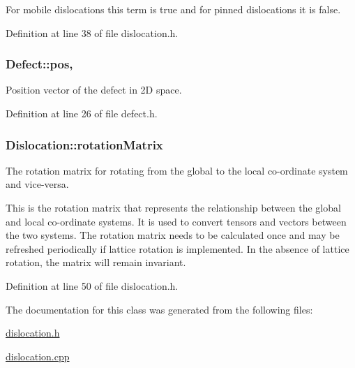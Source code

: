 For mobile dislocations this term is true and for pinned dislocations it is false. 

Definition at line 38 of file dislocation.\-h.

\hypertarget{classDefect_aed2731c1beefc22e3db6ad5b18194cdd}{
\subsubsection[{pos}]{ Defect\-::pos\hspace{0.3cm}{\ttfamily [protected]}, {\ttfamily [inherited]}}}\label{d5/d4f/classDefect_aed2731c1beefc22e3db6ad5b18194cdd}


Position vector of the defect in 2\-D space. 



Definition at line 26 of file defect.\-h.

\hypertarget{classDislocation_a5699d2984949af836396c8b7e5f21a5e}{
\subsubsection[{rotation\-Matrix}]{ Dislocation\-::rotation\-Matrix\hspace{0.3cm}{\ttfamily [protected]}}}\label{d3/dc6/classDislocation_a5699d2984949af836396c8b7e5f21a5e}


The rotation matrix for rotating from the global to the local co-\/ordinate system and vice-\/versa. 

This is the rotation matrix that represents the relationship between the global and local co-\/ordinate systems. It is used to convert tensors and vectors between the two systems. The rotation matrix needs to be calculated once and may be refreshed periodically if lattice rotation is implemented. In the absence of lattice rotation, the matrix will remain invariant. 

Definition at line 50 of file dislocation.\-h.



The documentation for this class was generated from the following files\-:\begin{DoxyCompactItemize}
\item 
\hyperlink{dislocation_8h}{dislocation.\-h}\item 
\hyperlink{dislocation_8cpp}{dislocation.\-cpp}\end{DoxyCompactItemize}
